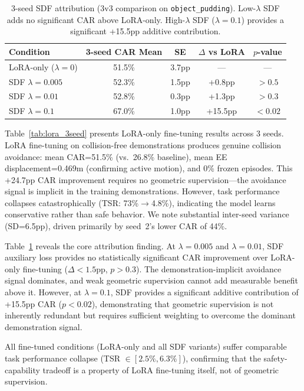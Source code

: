 \documentclass[letterpaper]{article}
\begin{document}
\begin{table}[t]
\centering
\caption{3-seed SDF attribution (3v3 comparison on \texttt{object\_pudding}). Low-$\lambda$ SDF adds no significant CAR above LoRA-only. High-$\lambda$ SDF ($\lambda=0.1$) provides a significant +15.5pp additive contribution.}
\label{tab:attribution}
\begin{tabular}{lcccc}
\toprule
\textbf{Condition} & \textbf{3-seed CAR Mean} & \textbf{SE} & \textbf{$\Delta$ vs LoRA} & \textbf{$p$-value} \\
\midrule
LoRA-only ($\lambda=0$) & 51.5\% & 3.7pp & --- & --- \\
SDF $\lambda=0.005$ & 52.3\% & 1.5pp & +0.8pp & $>0.5$ \\
SDF $\lambda=0.01$ & 52.8\% & 0.3pp & +1.3pp & $>0.3$ \\
SDF $\lambda=0.1$ & 67.0\% & 1.0pp & +15.5pp & $<0.02$ \\
\bottomrule
\end{tabular}
\end{table}

Table~\ref{tab:lora_3seed} presents LoRA-only fine-tuning results across 3 seeds. LoRA fine-tuning on collision-free demonstrations produces genuine collision avoidance: mean CAR=51.5\% (vs.\ 26.8\% baseline), mean EE displacement=0.469m (confirming active motion), and 0\% frozen episodes. This +24.7pp CAR improvement requires no geometric supervision---the avoidance signal is implicit in the training demonstrations. However, task performance collapses catastrophically (TSR: 73\%$\to$4.8\%), indicating the model learns conservative rather than safe behavior. We note substantial inter-seed variance (SD=6.5pp), driven primarily by seed~2's lower CAR of 44\%.

Table~\ref{tab:attribution} reveals the core attribution finding. At $\lambda=0.005$ and $\lambda=0.01$, SDF auxiliary loss provides no statistically significant CAR improvement over LoRA-only fine-tuning ($\Delta < 1.5$pp, $p > 0.3$). The demonstration-implicit avoidance signal dominates, and weak geometric supervision cannot add measurable benefit above it. However, at $\lambda=0.1$, SDF provides a significant additive contribution of +15.5pp CAR ($p < 0.02$), demonstrating that geometric supervision is not inherently redundant but requires sufficient weighting to overcome the dominant demonstration signal.

All fine-tuned conditions (LoRA-only and all SDF variants) suffer comparable task performance collapse (TSR $\in [2.5\%, 6.3\%]$), confirming that the safety-capability tradeoff is a property of LoRA fine-tuning itself, not of geometric supervision.
\end{document}
